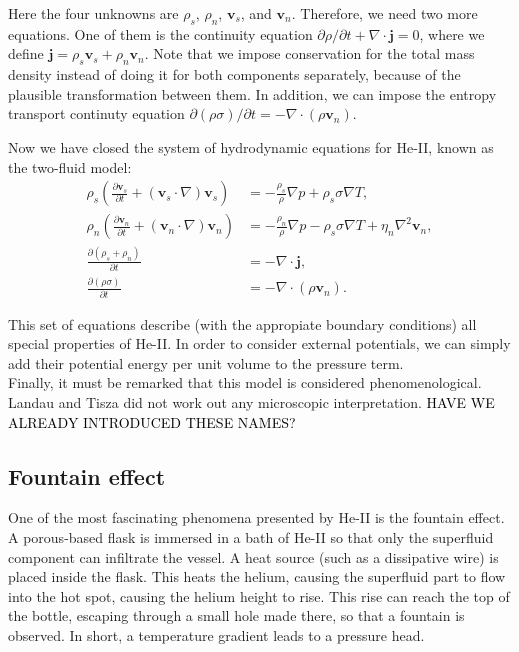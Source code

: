 \documentclass{article}
\newcommand{\black}{\textcolor{black}}
\begin{document}
Here the four unknowns are $\rho_s$, $\rho_n$, $\mathbf{v}_s$, and $\mathbf{v}_n$. Therefore, we need two more equations. One of them is the continuity equation $\partial \rho / \partial t + \nabla \cdot \mathbf{j} = 0$, where we define $\mathbf{j} = \rho_s \mathbf{v}_s + \rho_n \mathbf{v}_n $. Note that we impose conservation for the total mass density instead of doing it for both components separately, because of the plausible transformation between them. In addition, we can impose the entropy transport continuty equation $\partial (\rho \sigma) / \partial t = - \nabla \cdot (\rho \mathbf{v}_n)$.

Now we have closed the system of hydrodynamic equations for He-II, known as the two-fluid model:
\begin{align}
\rho_s \left( \frac{\partial \mathbf{v}_s}{\partial t} + (\mathbf{v}_s \cdot \nabla) \mathbf{v}_s \right) &= -\frac{\rho_s}{\rho} \nabla p + \rho_s \sigma \nabla T,  \\
\rho_n \left( \frac{\partial \mathbf{v}_n}{\partial t} + (\mathbf{v}_n \cdot \nabla) \mathbf{v}_n \right) &= -\frac{\rho_n}{\rho} \nabla p - \rho_s \sigma \nabla T + \eta_n \nabla^2 \mathbf{v}_n,  \\
\frac{\partial (\rho_s + \rho_n)}{\partial t} &= -\nabla \cdot \mathbf{j}, \\
\frac{\partial (\rho \sigma)}{\partial t} &= -\nabla \cdot (\rho \mathbf{v}_n). 
\end{align}

This set of equations describe (with the appropiate boundary conditions) all special properties of He-II. In order to consider external potentials, we can simply add their potential energy per unit volume to the pressure term. 
\\

Finally, it must be remarked that this model is considered phenomenological. Landau and Tisza did not work out any microscopic interpretation. \black{HAVE WE ALREADY INTRODUCED THESE NAMES?}

\subsection{Fountain effect}


One of the most fascinating phenomena presented by He-II is the fountain effect. A porous-based flask is immersed in a bath of He-II so that only the superfluid component can infiltrate the vessel. A heat source (such as a dissipative wire) is placed inside the flask. This heats the helium, causing the superfluid part to flow into the hot spot, causing the helium height to rise. This rise can reach the top of the bottle, escaping through a small hole made there, so that a fountain is observed. In short, a temperature gradient leads to a pressure head.
\\
\end{document}

